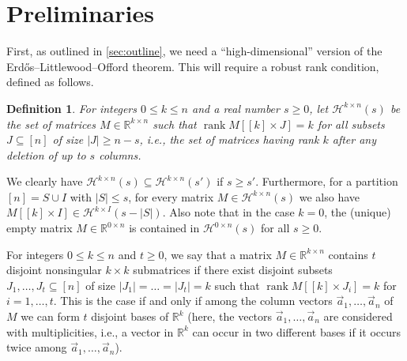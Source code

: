 \documentclass[english]{article}
\newtheorem{definition}[theorem]{Definition}
\theoremstyle{remark}
\numberwithin{equation}{section}
\numberwithin{figure}{section}
\newcommand{\su}{\subseteq}
\newcommand{\RR}{\mathbb{R}}
\newcommand{\on}{\operatorname}
\begin{document}
\section{Preliminaries}

First, as outlined in \cref{sec:outline}, we need a ``high-dimensional'' version of the Erd\H os--Littlewood--Offord theorem. This will require a robust rank condition, defined as follows.

\begin{definition}\label{def:Halasz}
For integers $0\le k\le n$ and a real number $s\ge 0$, let $\mathcal{H}^{k\times n}(s)$ be the set of matrices $M\in\RR^{k\times n}$ such that $\on{rank} M[[k]\times J]=k$ for all subsets $J\su [n]$ of size $|J|\ge n-s$, i.e., the set of matrices having rank $k$ after any deletion of up to $s$ columns.
\end{definition}

We clearly have $\mathcal{H}^{k\times n}(s)\su \mathcal{H}^{k\times n}(s')$ if $s\ge s'$. Furthermore, for a partition $[n]=S\cup I$ with $|S|\le s$, for every matrix $M\in \mathcal{H}^{k\times n}(s)$ we also have $M[[k]\times I]\in \mathcal{H}^{k\times I}(s-|S|)$. Also note that in the case $k=0$, the (unique) empty matrix $M\in\RR^{0\times n}$ is contained in $\mathcal{H}^{0\times n}(s)$ for all $s\ge 0$.

For integers $0\le k\le n$ and $t\ge 0$, we say that a matrix $M\in \RR^{k\times n}$ contains $t$ disjoint nonsingular $k\times k$ submatrices if there exist disjoint subsets $J_1,\dots, J_t\su [n]$ of size $|J_1|=\dots=|J_t|=k$ such that $\on{rank} M[[k]\times J_i]=k$ for $i=1,\dots,t$. This is the case if and only if among the column vectors $\vec{a}_1,\dots,\vec{a}_n$ of $M$ we can form $t$ disjoint bases of $\RR^{k}$ (here, the vectors $\vec{a}_1,\dots,\vec{a}_n$ are considered with multiplicities, i.e., a vector in $\RR^{k}$ can occur in two different bases if it occurs twice among $\vec{a}_1,\dots,\vec{a}_n$).
\end{document}
